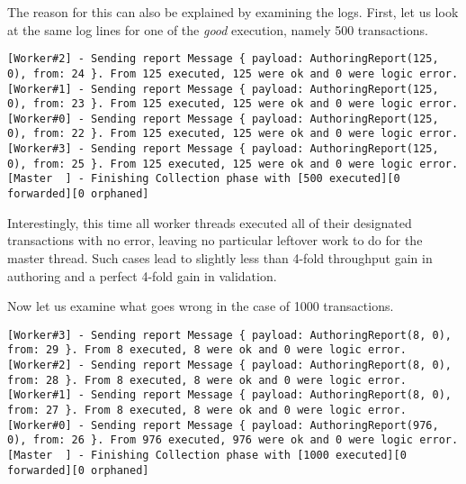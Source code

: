 The reason for this can also be explained by examining the logs. First, let us look at the same log
lines for one of the \textit{good} execution, namely 500 transactions.

\begin{lstlisting}
[Worker#2] - Sending report Message { payload: AuthoringReport(125, 0), from: 24 }. From 125 executed, 125 were ok and 0 were logic error.
[Worker#1] - Sending report Message { payload: AuthoringReport(125, 0), from: 23 }. From 125 executed, 125 were ok and 0 were logic error.
[Worker#0] - Sending report Message { payload: AuthoringReport(125, 0), from: 22 }. From 125 executed, 125 were ok and 0 were logic error.
[Worker#3] - Sending report Message { payload: AuthoringReport(125, 0), from: 25 }. From 125 executed, 125 were ok and 0 were logic error.
[Master  ] - Finishing Collection phase with [500 executed][0 forwarded][0 orphaned]
\end{lstlisting}

Interestingly, this time all worker threads executed all of their designated transactions with no
error, leaving no particular leftover work to do for the master thread. Such cases lead to slightly
less than 4-fold throughput gain in authoring and a perfect 4-fold gain in validation.

Now let us examine what goes wrong in the case of 1000 transactions.

\begin{lstlisting}
[Worker#3] - Sending report Message { payload: AuthoringReport(8, 0), from: 29 }. From 8 executed, 8 were ok and 0 were logic error.
[Worker#2] - Sending report Message { payload: AuthoringReport(8, 0), from: 28 }. From 8 executed, 8 were ok and 0 were logic error.
[Worker#1] - Sending report Message { payload: AuthoringReport(8, 0), from: 27 }. From 8 executed, 8 were ok and 0 were logic error.
[Worker#0] - Sending report Message { payload: AuthoringReport(976, 0), from: 26 }. From 976 executed, 976 were ok and 0 were logic error.
[Master  ] - Finishing Collection phase with [1000 executed][0 forwarded][0 orphaned]
\end{lstlisting}

